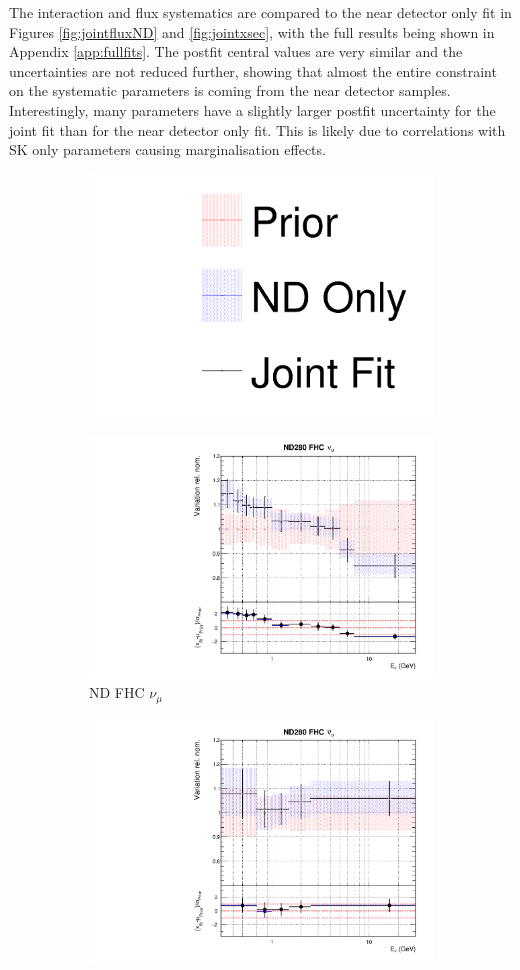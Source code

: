 The interaction and flux systematics are compared to the near detector only fit in Figures \ref{fig:jointfluxND} and \ref{fig:jointxsec}, with the full results being shown in Appendix \ref{app:fullfits}. The postfit central values are very similar and the uncertainties are not reduced further, showing that almost the entire constraint on the systematic parameters is coming from the near detector samples. Interestingly, many parameters have a slightly larger postfit uncertainty for the joint fit than for the near detector only fit. This is likely due to correlations with SK only parameters causing marginalisation effects.

\begin{figure}[!htbp]
\centering
\begin{subfigure}{0.8\textwidth}
  \centering
  \includegraphics[width=0.24\linewidth]{figs/joint_leg}
\end{subfigure}
\begin{subfigure}{0.49\textwidth}
  \centering
  \includegraphics[width=0.99\linewidth]{figs/jointflux0}
  \caption{ND FHC $\nu_{\mu}$}
\end{subfigure}
\begin{subfigure}{0.49\textwidth}
  \centering
  \includegraphics[width=0.99\linewidth]{figs/jointflux1}

\end{subfigure}
\end{figure}
